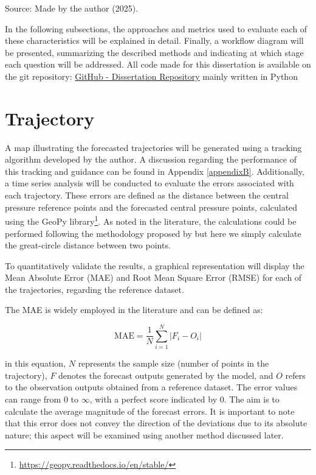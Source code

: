 \begin{center}
Source: Made by the author (2025).
\end{center}

In the following subsections, the approaches and metrics used to evaluate each of these characteristics will be explained in detail. Finally, a workflow diagram will be presented, summarizing the described methods and indicating at which stage each question will be addressed.
All code made for this dissertation is available on the git repository: \href{https://github.com/biancafusi/Dissertation}{GitHub - Dissertation Repository} mainly written in Python

\section{Trajectory}

A map illustrating the forecasted trajectories will be generated using a tracking algorithm developed by the author. A discussion regarding the performance of this tracking and guidance can be found in Appendix \ref{appendixB}. Additionally, a time series analysis will be conducted to evaluate the errors associated with each trajectory. These errors are defined as the distance between the central pressure reference points and the forecasted central pressure points, calculated using the GeoPy library\footnote{\href{https://geopy.readthedocs.io/en/stable/}{https://geopy.readthedocs.io/en/stable/}}. As noted in the literature, the calculations could be performed following the methodology proposed by  but here we simply calculate the great-circle distance between two points. 

To quantitatively validate the results, a graphical representation will display the Mean Absolute Error (MAE) and Root Mean Square Error (RMSE) for each of the trajectories, regarding the reference dataset.

The MAE is widely employed \cite{ditchek2023improving, nyongesa2024influence} in the literature and can be defined as:

\begin{equation}
    \text{MAE} = \frac{1}{N}\sum_{i=1}^{N} |F_i -O_i|
\end{equation}

\noindent in this equation, $N$ represents the sample size (number of points in the trajectory), $F$ denotes the forecast outputs generated by the model, and $O$ refers to the observation outputs obtained from a reference dataset. The error values can range from 0 to $\infty$, with a perfect score indicated by 0. The aim is to calculate the average magnitude of the forecast errors. It is important to note that this error does not convey the direction of the deviations due to its absolute nature; this aspect will be examined using another method discussed later.

